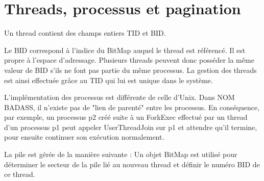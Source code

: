 \documentclass[12pt]{report}
\begin{document}
%
%
%
%
%


\section{Threads, processus et pagination}

Un thread contient des champs entiers TID et BID.

Le BID correspond à l'indice du BitMap auquel le thread est référencé. Il est propre à l'espace d'adressage. Plusieurs threads peuvent donc posséder la même valeur de BID s'ils ne font pas partie du même processus. La gestion des threads est ainsi effectuée grâce au TID qui lui est unique dans le système.

\bigskip

L'implémentation des processus est différente de celle d'Unix. Dans \color{red}NOM BADASS\color{black}, il n'existe pas de "lien de parenté" entre les processus. En conséquence, par exemple, un processus p2 créé suite à un ForkExec effectué par un thread d'un processus p1 peut appeler UserThreadJoin sur p1 et attendre qu'il termine, pour ensuite continuer son exécution normalement.
\bigskip

La pile est gérée de la manière suivante :
Un objet BitMap est utilisé pour déterminer le secteur de la pile lié au nouveau thread et définir le numéro BID de ce thread.
\end{document}
